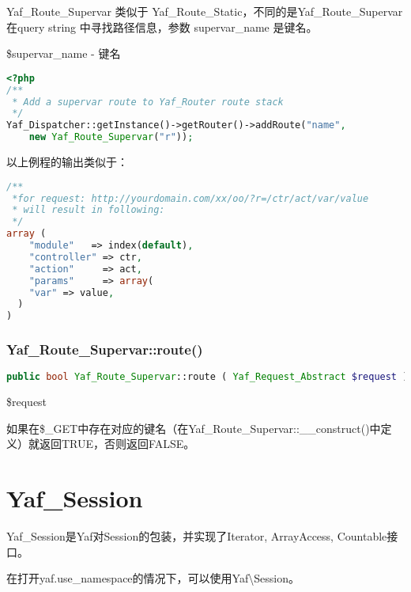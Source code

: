 Yaf\_Route\_Supervar 类似于 Yaf\_Route\_Static，不同的是Yaf\_Route\_Supervar 在query string 中寻找路径信息，参数 supervar\_name 是键名。

\begin{compactitem}
\item \$supervar\_name - 键名
\end{compactitem}



\begin{lstlisting}[language=PHP]
<?php
/**
 * Add a supervar route to Yaf_Router route stack
 */
Yaf_Dispatcher::getInstance()->getRouter()->addRoute("name",
    new Yaf_Route_Supervar("r"));
\end{lstlisting}

以上例程的输出类似于：

\begin{lstlisting}[language=PHP]
/** 
 *for request: http://yourdomain.com/xx/oo/?r=/ctr/act/var/value
 * will result in following:
 */
array (
    "module"   => index(default),
    "controller" => ctr,
    "action"     => act,
    "params"     => array(
    "var" => value,
  )
)
\end{lstlisting}


\subsection{Yaf\_Route\_Supervar::route()}




\begin{lstlisting}[language=PHP]
public bool Yaf_Route_Supervar::route ( Yaf_Request_Abstract $request )
\end{lstlisting}

\begin{compactitem}
\item \$request
\end{compactitem}

如果在\$\_GET中存在对应的键名（在Yaf\_Route\_Supervar::\_\_construct()中定义）就返回TRUE，否则返回FALSE。

\chapter{Yaf\_Session}

Yaf\_Session是Yaf对Session的包装，并实现了Iterator, ArrayAccess, Countable接口。

在打开yaf.use\_namespace的情况下，可以使用Yaf\textbackslash Session。


